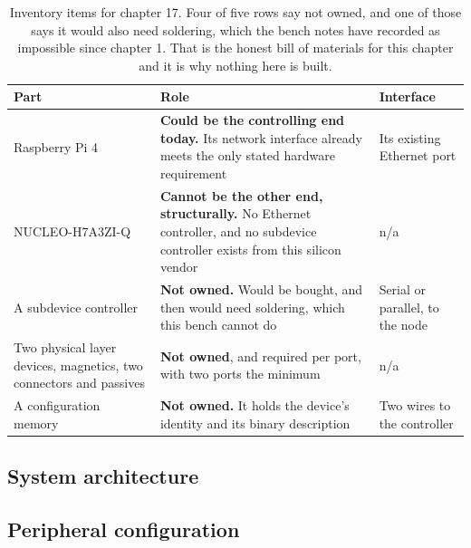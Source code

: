 \begin{table}[H]\centering\small
\begin{tabular}{p{40mm}p{66mm}p{40mm}}
\toprule
Part & Role & Interface \\
\midrule
Raspberry Pi 4 & \textbf{Could be the controlling end today.} Its network
interface already meets the only stated hardware requirement & Its existing
Ethernet port \\
NUCLEO-H7A3ZI-Q & \textbf{Cannot be the other end, structurally.} No Ethernet
controller, and no subdevice controller exists from this silicon vendor & n/a \\
A subdevice controller & \textbf{Not owned.} Would be bought, and then would
need soldering, which this bench cannot do & Serial or parallel, to the node \\
Two physical layer devices, magnetics, two connectors and passives &
\textbf{Not owned}, and required per port, with two ports the minimum & n/a \\
A configuration memory & \textbf{Not owned.} It holds the device's identity and
its binary description & Two wires to the controller \\
\bottomrule
\end{tabular}
\caption{Inventory items for chapter 17. Four of five rows say not owned, and one of those says it would also need soldering, which the bench notes have recorded as impossible since chapter 1. That is the honest bill of materials for this chapter and it is why nothing here is built.}
\end{table}

\subsection*{System architecture}


\subsection*{Peripheral configuration}

